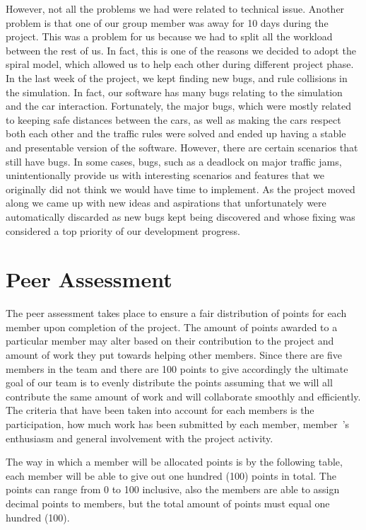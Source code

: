 \documentclass[oneside]{article}
\begin{document}
\noindent However, not all the problems we had were related to technical issue. Another problem is that one of our group member was away for 10 days during the project. This was a problem for us because we had to split all the workload between the rest of us. In fact, this is one of the reasons we decided to adopt the spiral model, which allowed us to help each other during different project phase. In the last week of the project, we kept finding new bugs, and rule collisions in the simulation. In fact, our software has many bugs relating to the simulation and the car interaction. Fortunately, the major bugs, which were mostly related to keeping safe distances between the cars, as well as making the cars respect both each other and the traffic rules were solved and ended up having a stable and presentable version of the software. However, there are certain scenarios that still have bugs. In some cases, bugs, such as a deadlock on major traffic jams, unintentionally provide us with interesting scenarios and features that we originally did not think we would have time to implement. As the project moved along we came up with new ideas and aspirations that unfortunately were automatically discarded as new bugs kept being discovered and whose fixing was considered a top priority of our development progress.
\newpage

\section{Peer Assessment}

\noindent 
The peer assessment takes place to ensure a fair distribution of points for each member upon completion of the project. The amount of points awarded to a particular member may alter based on their contribution to the project and amount of work they put towards helping other members. Since there are five members in the team and there are 100 points to give accordingly the ultimate goal of our team is to evenly distribute the points assuming that we will all contribute the same amount of work and will collaborate smoothly and efficiently. The criteria that have been taken into account for each members is the participation, how much work has been submitted by each member, member\ 's enthusiasm and general involvement with the project activity.
\newline

\noindent The way in which a member will be allocated points is by the following table, each member will be able to give out one hundred (100) points in total. The points can range from 0 to 100 inclusive, also the members are able to assign decimal points to members, but the total amount of points must equal one hundred (100).
\end{document}
